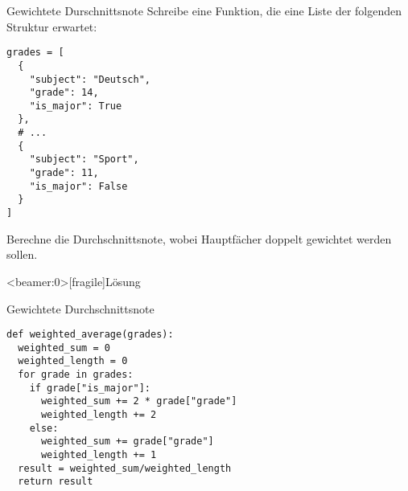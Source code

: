 \begin{fragile}

\begin{block}{Gewichtete Durschnittsnote}
	\vspace{2pt}
Schreibe eine Funktion, die eine Liste der folgenden Struktur erwartet: 

\begin{verbatim}
grades = [ 
  { 
    "subject": "Deutsch", 
    "grade": 14,
    "is_major": True
  },
  # ... 
  {
    "subject": "Sport",
    "grade": 11, 
    "is_major": False
  }
]
\end{verbatim}

Berechne die Durchschnittsnote, wobei Hauptfächer doppelt gewichtet werden sollen. 
\end{block}

\end{fragile}

\begin{frame}<beamer:0>[fragile]{Lösung}

\begin{solutionblock}{Gewichtete Durchschnittsnote}
\begin{verbatim}
def weighted_average(grades): 
  weighted_sum = 0
  weighted_length = 0
  for grade in grades: 
    if grade["is_major"]: 
      weighted_sum += 2 * grade["grade"]
      weighted_length += 2
    else:
      weighted_sum += grade["grade"]
      weighted_length += 1
  result = weighted_sum/weighted_length
  return result 
\end{verbatim}
\end{solutionblock}

\end{frame}


